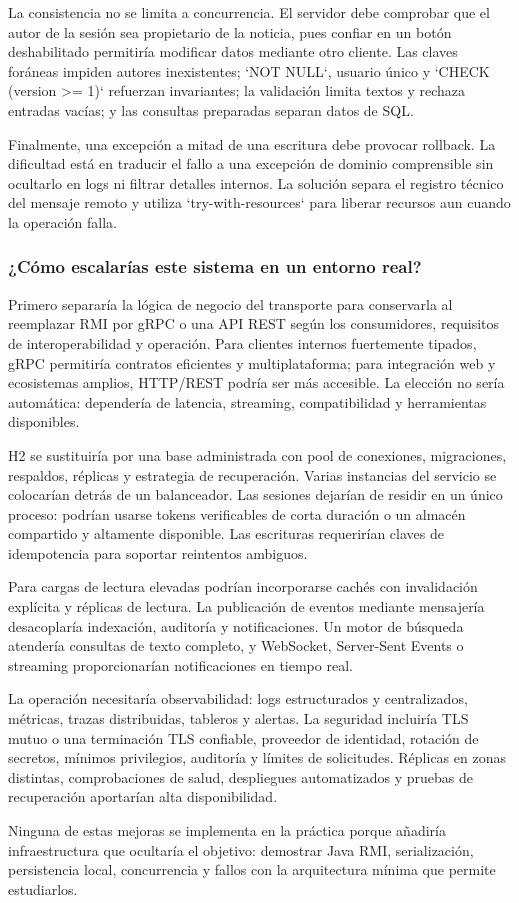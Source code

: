 La consistencia no se limita a concurrencia. El servidor debe comprobar que el autor de la sesión sea propietario de la noticia, pues confiar en un botón deshabilitado permitiría modificar datos mediante otro cliente. Las claves foráneas impiden autores inexistentes; `NOT NULL`, usuario único y `CHECK (version >= 1)` refuerzan invariantes; la validación limita textos y rechaza entradas vacías; y las consultas preparadas separan datos de SQL.

Finalmente, una excepción a mitad de una escritura debe provocar rollback. La dificultad está en traducir el fallo a una excepción de dominio comprensible sin ocultarlo en logs ni filtrar detalles internos. La solución separa el registro técnico del mensaje remoto y utiliza `try-with-resources` para liberar recursos aun cuando la operación falla.

\subsubsection*{¿Cómo escalarías este sistema en un entorno real?}

Primero separaría la lógica de negocio del transporte para conservarla al reemplazar RMI por gRPC o una API REST según los consumidores, requisitos de interoperabilidad y operación. Para clientes internos fuertemente tipados, gRPC permitiría contratos eficientes y multiplataforma; para integración web y ecosistemas amplios, HTTP/REST podría ser más accesible. La elección no sería automática: dependería de latencia, streaming, compatibilidad y herramientas disponibles.

H2 se sustituiría por una base administrada con pool de conexiones, migraciones, respaldos, réplicas y estrategia de recuperación. Varias instancias del servicio se colocarían detrás de un balanceador. Las sesiones dejarían de residir en un único proceso: podrían usarse tokens verificables de corta duración o un almacén compartido y altamente disponible. Las escrituras requerirían claves de idempotencia para soportar reintentos ambiguos.

Para cargas de lectura elevadas podrían incorporarse cachés con invalidación explícita y réplicas de lectura. La publicación de eventos mediante mensajería desacoplaría indexación, auditoría y notificaciones. Un motor de búsqueda atendería consultas de texto completo, y WebSocket, Server-Sent Events o streaming proporcionarían notificaciones en tiempo real.

La operación necesitaría observabilidad: logs estructurados y centralizados, métricas, trazas distribuidas, tableros y alertas. La seguridad incluiría TLS mutuo o una terminación TLS confiable, proveedor de identidad, rotación de secretos, mínimos privilegios, auditoría y límites de solicitudes. Réplicas en zonas distintas, comprobaciones de salud, despliegues automatizados y pruebas de recuperación aportarían alta disponibilidad.

Ninguna de estas mejoras se implementa en la práctica porque añadiría infraestructura que ocultaría el objetivo: demostrar Java RMI, serialización, persistencia local, concurrencia y fallos con la arquitectura mínima que permite estudiarlos.
